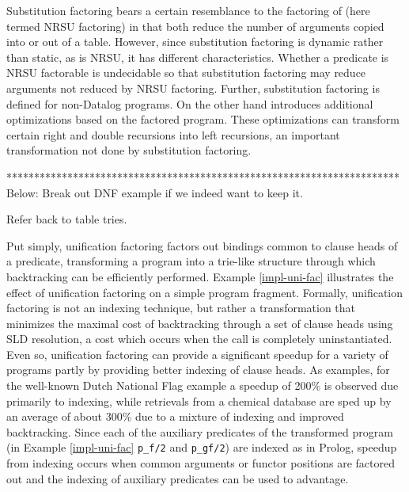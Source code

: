 Substitution factoring bears a certain resemblance to the factoring of
\cite{NRSU89} (here termed NRSU factoring) in that both reduce the
number of arguments copied into or out of a table.  However, since
substitution factoring is dynamic rather than static, as is NRSU, it
has different characteristics.  Whether a predicate is NRSU factorable
is undecidable so that substitution factoring may reduce arguments not
reduced by NRSU factoring.  Further, substitution factoring is defined
for non-Datalog programs.  On the other hand \cite{NRSU89} introduces
additional optimizations based on the factored program.  These
optimizations can transform certain right and double recursions into
left recursions, an important transformation not done by substitution
factoring.

***********************************************************************
Below: Break out DNF example if we indeed want to keep it.

Refer back to table tries.

Put simply, unification factoring factors out bindings common to
clause heads of a predicate, transforming a program into a trie-like
structure through which backtracking can be efficiently performed.
Example \ref{impl-uni-fac} illustrates the effect of unification
factoring on a simple program fragment.  Formally, unification
factoring is not an indexing technique, but rather a transformation
that minimizes the maximal cost of backtracking through a set of
clause heads using SLD resolution, a cost which occurs when the call
is completely uninstantiated.  Even so, unification factoring can
provide a significant speedup for a variety of programs partly by
providing better indexing of clause heads.  As examples, for the
well-known Dutch National Flag example
\cite{StSh86} a speedup of 200\% is observed due primarily to indexing,
while retrievals from a chemical database are sped up by an average of
about 300\% due to a mixture of indexing and improved backtracking.
Since each of the auxiliary predicates of the transformed program (in
Example \ref{impl-uni-fac} {\tt p\_f/2} and {\tt p\_gf/2}) are indexed
as in Prolog, speedup from indexing occurs when common arguments or
functor positions are factored out and the indexing of auxiliary
predicates can be used to advantage.


